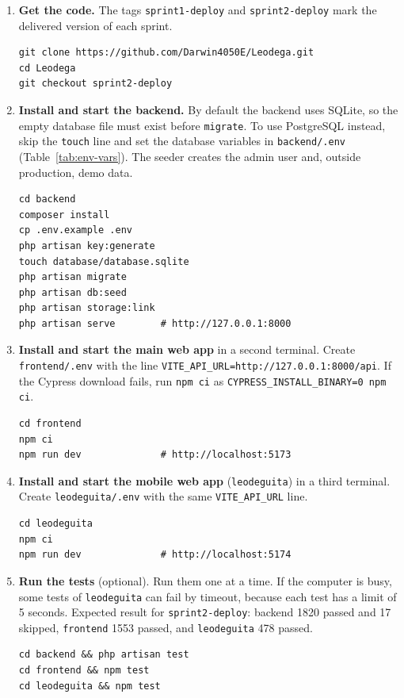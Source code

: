 \begin{enumerate}[nosep]
  \item \textbf{Get the code.}
        The tags \texttt{sprint1-deploy} and \texttt{sprint2-deploy} mark the delivered version of each sprint.
\begin{lstlisting}[language={}]
git clone https://github.com/Darwin4050E/Leodega.git
cd Leodega
git checkout sprint2-deploy
\end{lstlisting}
  \item \textbf{Install and start the backend.}
        By default the backend uses SQLite, so the empty database file must exist before \texttt{migrate}.
        To use PostgreSQL instead, skip the \texttt{touch} line and set the database variables in \texttt{backend/.env} (Table~\ref{tab:env-vars}).
        The seeder creates the admin user and, outside production, demo data.
\begin{lstlisting}[language={}]
cd backend
composer install
cp .env.example .env
php artisan key:generate
touch database/database.sqlite
php artisan migrate
php artisan db:seed
php artisan storage:link
php artisan serve        # http://127.0.0.1:8000
\end{lstlisting}
  \item \textbf{Install and start the main web app} in a second terminal.
        Create \texttt{frontend/.env} with the line \texttt{VITE\_API\_URL=http://127.0.0.1:8000/api}.
        If the Cypress download fails, run \texttt{npm ci} as \texttt{CYPRESS\_INSTALL\_BINARY=0 npm ci}.
\begin{lstlisting}[language={}]
cd frontend
npm ci
npm run dev              # http://localhost:5173
\end{lstlisting}
  \item \textbf{Install and start the mobile web app} (\texttt{leodeguita}) in a third terminal.
        Create \texttt{leodeguita/.env} with the same \texttt{VITE\_API\_URL} line.
\begin{lstlisting}[language={}]
cd leodeguita
npm ci
npm run dev              # http://localhost:5174
\end{lstlisting}
  \item \textbf{Run the tests} (optional).
        Run them one at a time.
        If the computer is busy, some tests of \texttt{leodeguita} can fail by timeout, because each test has a limit of 5 seconds.
        Expected result for \texttt{sprint2-deploy}: backend 1820 passed and 17 skipped, \texttt{frontend} 1553 passed, and \texttt{leodeguita} 478 passed.
\begin{lstlisting}[language={}]
cd backend && php artisan test
cd frontend && npm test
cd leodeguita && npm test
\end{lstlisting}
\end{enumerate}


